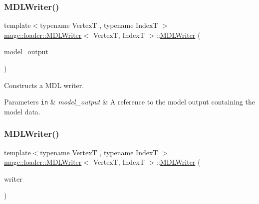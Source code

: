 \subsubsection{\texorpdfstring{M\+D\+L\+Writer()}{MDLWriter()}\hspace{0.1cm}{\footnotesize\ttfamily [1/3]}}
{\footnotesize\ttfamily template$<$typename VertexT , typename IndexT $>$ \\
\hyperlink{classmage_1_1loader_1_1_m_d_l_writer}{mage\+::loader\+::\+M\+D\+L\+Writer}$<$ VertexT, IndexT $>$\+::\hyperlink{classmage_1_1loader_1_1_m_d_l_writer}{M\+D\+L\+Writer} (\begin{DoxyParamCaption}\item[{const \hyperlink{structmage_1_1_model_output}{Model\+Output}$<$ VertexT, IndexT $>$ \&}]{model\+\_\+output }\end{DoxyParamCaption})\hspace{0.3cm}{\ttfamily [explicit]}}

Constructs a M\+DL writer.


\begin{DoxyParams}[1]{Parameters}
\mbox{\tt in}  & {\em model\+\_\+output} & A reference to the model output containing the model data. \\
\hline
\end{DoxyParams}
\hypertarget{classmage_1_1loader_1_1_m_d_l_writer_a2c63abb8bf2861f52715ab8ad495038e}{}\label{classmage_1_1loader_1_1_m_d_l_writer_a2c63abb8bf2861f52715ab8ad495038e} 
\subsubsection{\texorpdfstring{M\+D\+L\+Writer()}{MDLWriter()}\hspace{0.1cm}{\footnotesize\ttfamily [2/3]}}
{\footnotesize\ttfamily template$<$typename VertexT , typename IndexT $>$ \\
\hyperlink{classmage_1_1loader_1_1_m_d_l_writer}{mage\+::loader\+::\+M\+D\+L\+Writer}$<$ VertexT, IndexT $>$\+::\hyperlink{classmage_1_1loader_1_1_m_d_l_writer}{M\+D\+L\+Writer} (\begin{DoxyParamCaption}\item[{const \hyperlink{classmage_1_1loader_1_1_m_d_l_writer}{M\+D\+L\+Writer}$<$ VertexT, IndexT $>$ \&}]{writer }\end{DoxyParamCaption})\hspace{0.3cm}{\ttfamily [delete]}}

